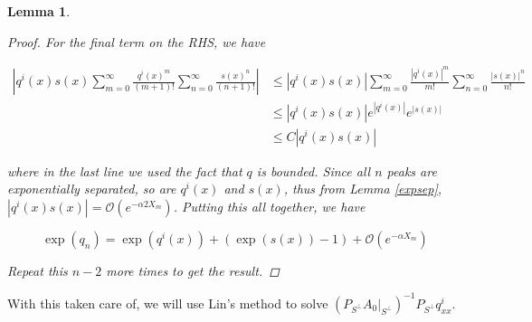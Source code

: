 \documentclass[12pt]{article}
\newtheorem{lemma}{Lemma}
\begin{document}
\begin{lemma}
\begin{proof}
For the final term on the RHS, we have

\begin{align*}
\left| q^i(x)s(x)\sum_{m=0}^\infty \frac{q^i(x)^m}{(m+1)!} \sum_{n=0}^\infty \frac{s(x)^n}{(n+1)!} \right| 
&\leq \left| q^i(x)s(x) \right| \sum_{m=0}^\infty \frac{|q^i(x)|^m}{m!} 
\sum_{n=0}^\infty \frac{|s(x)|^n}{n!} \\
&\leq \left| q^i(x)s(x) \right| e^{|q^i(x)|}e^{|s(x)|} \\
&\leq C \left| q^i(x)s(x) \right|
\end{align*}

where in the last line we used the fact that $q$ is bounded. Since all $n$ peaks are exponentially separated, so are $q^i(x)$ and $s(x)$, thus from Lemma \ref{expsep}, $\left| q^i(x)s(x) \right| = \mathcal{O}(e^{-\alpha 2 X_m})$. Putting this all together, we have

\begin{equation}
\exp(q_n) = \exp( q^i(x)) + (\exp(s(x)) - 1) + \mathcal{O}(e^{-\alpha X_m}) 
\end{equation}

Repeat this $n - 2$ more times to get the result.

\end{proof}
\end{lemma}

With this taken care of, we will use Lin's method to solve $(P_{S^\perp} A_0 |_{S^\perp})^{-1} P_{S^\perp} q^i_{xx}$.

\end{document}

